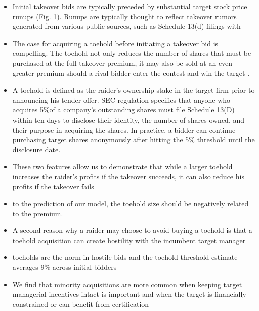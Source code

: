\documentclass[12pt]{article}
\begin{document}
\begin{itemize}
        \item Initial takeover bids are typically preceded by substantial target stock price runups (Fig. 1). Runups are typically thought to
        reflect takeover rumors generated from various public sources, such as Schedule 13(d) filings with \citep{Eckbo2009}

        \item The case for acquiring a toehold before initiating a takeover bid is compelling. The toehold not only reduces the number of
        shares that must be purchased at the full takeover premium, it may also be sold at an even greater premium should a rival bidder enter the contest and win the target . \citep{Eckbo2009}

        \item A toehold is defined as the raider’s ownership stake in the target firm prior to announcing his tender offer. SEC regulation specifies that anyone who acquires 5\%of a company’s outstanding shares must file Schedule 13(D) within ten days to disclose their identity, the number of shares owned, and their purpose in acquiring the shares. In practice, a bidder can continue purchasing target shares anonymously after hitting the 5\% threshold until the disclosure date. \citep{Goldman2005}

        \item These two features allow us to demonstrate that while a larger toehold increases the raider’s profits if the takeover succeeds, it can also reduce his profits if the takeover fails \citep{Goldman2005}

        \item to the prediction of our model, the toehold size should be negatively related to the premium. \citep{Goldman2005}

        \item A second reason why a raider may choose to avoid buying a toehold is that a toehold acquisition can create hostility with the incumbent target manager \citep{Goldman2005}

        \item toeholds are the norm in hostile bids and the toehold threshold estimate averages 9\% across initial bidders \citep{Betton2009}
 
        \item We find that minority acquisitions are more common when keeping target managerial incentives intact is important and when the target is financially constrained or can benefit from certification \citep{Ouimet2013}


\end{itemize}
\end{document}
